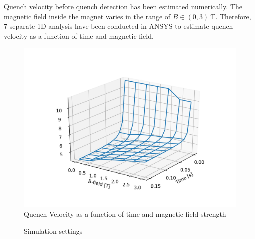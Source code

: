 
Quench velocity before quench detection has been estimated numerically. The magnetic field inside the magnet varies in the range of $B \in (0, 3)~\text{T}$. Therefore, 7 separate 1D analysis have been conducted in ANSYS to estimate quench velocity as a function of time and magnetic field.

\begin{figure}[ht!]
    \centering
    \includegraphics[width=0.6\linewidth]{figures/skew_quad_bcs/magnetic_field_mapping/Quench_Velocity_Map.png}
    \caption{Quench Velocity as a function of time and magnetic field strength}
    \label{fig:Q_v_map}
\end{figure}

\begin{figure}[H]
\centering
{}
\caption{Simulation settings}
\label{fig:sim_settings_1}
\end{figure}


